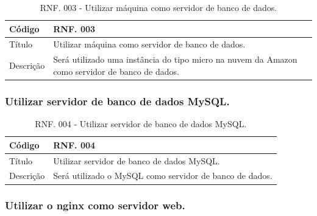 \documentclass[11pt]{article}
\begin{document}
        \begin{table}[h]
          \begin{center}
            \begin{tabular}{ | p{5cm} | p{10cm} | }
              \hline
              Código\cellcolor{gray} & RNF. 003\cellcolor{gray} \\
              \hline
              Título & Utilizar máquina como servidor de banco de dados. \\
              \hline
              Descrição & Será utilizado uma instância do tipo micro na nuvem da Amazon como servidor de banco de dados. \\
              \hline
            \end{tabular}
            \caption{RNF. 003 - Utilizar máquina como servidor de banco de dados.}
          \end{center}
        \end{table}

      \subsubsection{Utilizar servidor de banco de dados MySQL.}

        \begin{table}[h]
          \begin{center}
            \begin{tabular}{ | p{5cm} | p{10cm} | }
              \hline
              Código\cellcolor{gray} & RNF. 004\cellcolor{gray} \\
              \hline
              Título & Utilizar servidor de banco de dados MySQL. \\
              \hline
              Descrição & Será utilizado o MySQL como servidor de banco de dados. \\
              \hline
            \end{tabular}
            \caption{RNF. 004 - Utilizar servidor de banco de dados MySQL.}
          \end{center}
        \end{table}

      \subsubsection{Utilizar o nginx como servidor web.}
\end{document}
